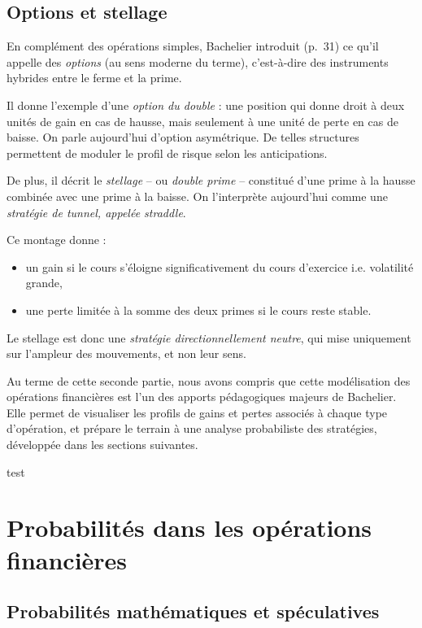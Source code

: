 \documentclass[12pt,a4paper]{article}
\begin{document}
\subsection{Options et stellage}

En complément des opérations simples, Bachelier introduit (p.~31) ce qu’il appelle des \textit{options} (au sens moderne du terme), c’est-à-dire des instruments hybrides entre le ferme et la prime.

Il donne l’exemple d’une \textit{option du double} : une position qui donne droit à deux unités de gain en cas de hausse, mais seulement à une unité de perte en cas de baisse. On parle aujourd’hui d’option asymétrique. De telles structures permettent de moduler le profil de risque selon les anticipations.

De plus, il décrit le \textit{stellage} -- ou \textit{double prime} -- constitué d’une prime à la hausse combinée avec une prime à la baisse. On l’interprète aujourd’hui comme une \textit{stratégie de tunnel, appelée straddle}.

Ce montage donne :
\begin{itemize}
  \item un gain si le cours s’éloigne significativement du cours d’exercice i.e. volatilité grande,
  \item une perte limitée à la somme des deux primes si le cours reste stable.
\end{itemize}

Le stellage est donc une \textit{stratégie directionnellement neutre}, qui mise uniquement sur l’ampleur des mouvements, et non leur sens.

\bigskip

\noindent
Au terme de cette seconde partie, nous avons compris que cette modélisation des opérations financières est l’un des apports pédagogiques majeurs de Bachelier. Elle permet de visualiser les profils de gains et pertes associés à chaque type d’opération, et prépare le terrain à une analyse probabiliste des stratégies, développée dans les sections suivantes.

test

\section{Probabilités dans les opérations financières}
\subsection{Probabilités mathématiques et spéculatives}
\end{document}
